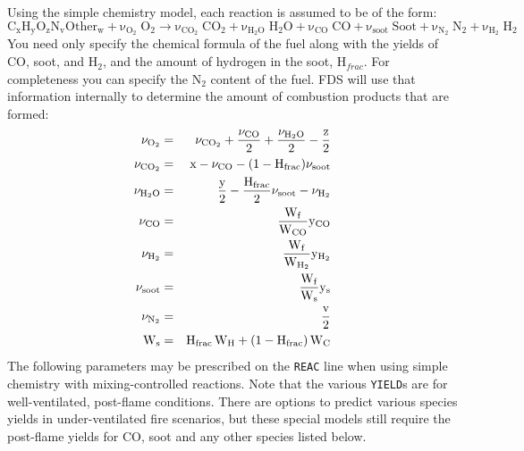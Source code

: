 \documentclass[11pt]{book}
\newcommand{\ct}{\tt\small}
\newcommand{\be}{\begin{equation}}
\newcommand{\ee}{\end{equation}}
\begin{document}
\noindent
Using the simple chemistry model, each reaction is assumed to be of the form:
\be \mathrm{C_xH_yO_zN_vOther_w + \nu_{O_2} \; O_2 \rightarrow
    \nu_{CO_2} \; CO_2 + \nu_{H_2O} \; H_2O +
    \nu_{CO}   \; CO   + \nu_{soot} \; Soot + \nu_{N_2} \; N_2 + \nu_{H_2} \; H_2 } \ee
You need only specify the chemical formula of the fuel along with
the yields of CO, soot, and H$_2$, and the amount of hydrogen in the soot, H$_{frac}$.
For completeness you can specify the N$_2$ content of
the fuel. FDS will use that information internally to
determine the amount of combustion products that are formed:
\begin{eqnarray*}
\mathrm{ \nu_{O_2}  }    &=& \mathrm{ \nu_{CO_2} + \frac{\nu_{CO}}{2} + \frac{\nu_{H_2O}}{2} - \frac{\hbox{z}}{2}  } \\
\mathrm{ \nu_{CO_2} }    &=& \mathrm{ \hbox{x} - \nu_{CO} - (1-H_{frac}) \nu_{soot} }  \\
\mathrm{ \nu_{H_2O} }    &=& \mathrm{ \frac{\hbox{y}}{2} - \frac{H_{frac}}{2} \nu_{soot} - \nu_{H_2} } \\
\mathrm{ \nu_{CO}   }    &=& \mathrm{ \frac{W_f}{W_{CO}} y_{CO} } \\
\mathrm{ \nu_{H_2}  }    &=& \mathrm{ \frac{W_f}{W_{H_2}} y_{H_2} } \\
\mathrm{ \nu_{soot} }    &=& \mathrm{ \frac{W_f}{W_s} y_s } \\
\mathrm{ \nu_{N_2}  }    &=& \mathrm{ \frac{\hbox{v}}{2} } \\
\mathrm{ W_s        }    &=& \mathrm{ H_{frac} \, W_H + (1-H_{frac}) \, W_C }
\end{eqnarray*}
The following parameters may be prescribed on the {\ct REAC} line when using simple chemistry with mixing-controlled reactions.
Note that the various {\ct YIELD}s are for well-ventilated, post-flame conditions. There are options to
predict various species yields in under-ventilated fire scenarios, but these special models still require
the post-flame yields for CO, soot and any other species listed below.
\end{document}
